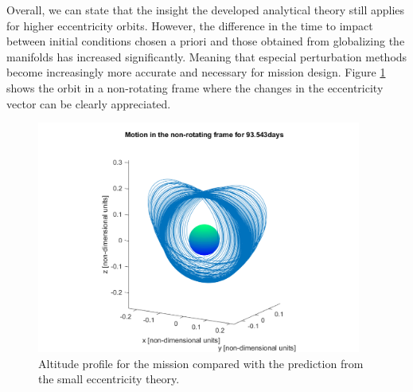 Overall, we can state that the insight the developed analytical theory still applies for higher eccentricity orbits. However, the difference in the time to impact between initial conditions chosen a priori and those obtained from globalizing the manifolds has increased significantly. Meaning that especial perturbation methods become increasingly more accurate and necessary for mission design. Figure \ref{fig:JUICEorbit} shows the orbit in a non-rotating frame where the changes in the eccentricity vector can be clearly appreciated.

\begin{figure}[H]
	\centering
	\includegraphics[height=3in]
	{figures/GanymedeESA/motionFixedFrame.png}
	\caption{Altitude profile for the mission compared with the prediction from the small eccentricity theory.}
	\label{fig:JUICEorbit}
\end{figure}

